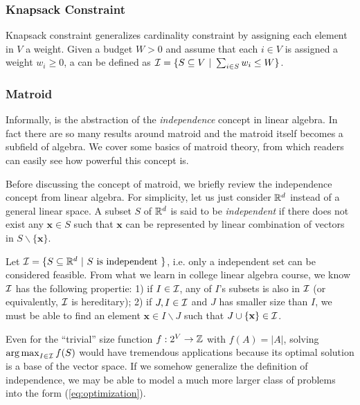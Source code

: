 \subsubsection{Knapsack Constraint}
Knapsack constraint generalizes cardinality constraint by assigning each element in $V$ a weight. Given a budget $W > 0$ and assume that each $i \in V$ is assigned a weight $w_i \geq 0$, a  can be defined as $\mathcal{I} = \{S \subseteq V ~|~ \sum_{i\in S} w_i \leq W \}$.


\subsubsection{Matroid}
Informally,   is the abstraction of the \emph{independence} concept in linear algebra. In fact there are so many results around matroid and the matroid itself becomes a subfield of algebra. We cover some basics of matroid theory, from which readers can easily see how powerful this concept is. 

Before discussing the concept of  matroid, we briefly review the independence concept from linear algebra. For simplicity, let us just consider $\mathbb{R}^d$ instead of a general linear space. A subset $S$ of $\mathbb{R}^d$ is said to be \emph{independent} if there does not exist any $\mathbf{x}\in S$ such that $\mathbf{x}$ can be represented by linear combination of vectors in $S\backslash\{\mathbf{x}\}$. 

Let $\mathcal{I} = \{S \subseteq \mathbb{R}^d~|~S ~\text{is independent}~\}$, i.e. only a independent set can be considered feasible. From what we learn in college linear algebra course, we know $\mathcal{I}$ has the following propertie: 1) if $I\in \mathcal{I}$, any of $I$'s subsets is also in $\mathcal{I}$ (or equivalently, $\mathcal{I}$ is hereditary); 2) if $J, I\in \mathcal{I}$ and $J$ has smaller size than $I$, we must be able to find an element  $\mathbf{x} \in I\backslash J$ such that $J\cup \{\mathbf{x}\} \in \mathcal{I}$. 

Even for the ``trivial'' size function $f: 2^V \rightarrow \mathbb{Z}$ with $f(A) = |A|$, solving $\operatorname*{arg\,max}_{I\in\mathcal{I}} f(S)$ would have tremendous applications because its optimal solution is a base of the vector space.  If we somehow generalize the definition of independence, we may be able to model a much more larger class of problems into the form (\ref{eq:optimization}). 

